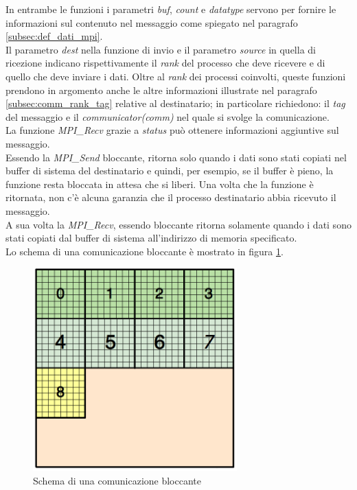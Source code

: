 In entrambe le funzioni i parametri \textit{buf}, \textit{count} e \textit{datatype} servono per fornire le informazioni sul contenuto nel messaggio come spiegato nel paragrafo \ref{subsec:def_dati_mpi}.\\
Il parametro \textit{dest} nella funzione di invio e il parametro \textit{source} in quella di ricezione indicano rispettivamente il \textit{rank} del processo che deve ricevere e di quello che deve inviare i dati. Oltre al \textit{rank} dei processi coinvolti, queste funzioni prendono in argomento anche le altre informazioni illustrate nel paragrafo \ref{subsec:comm_rank_tag} relative al destinatario; in particolare richiedono: il \textit{tag} del messaggio e il \textit{communicator(comm)} nel quale si svolge la comunicazione.\\
La funzione \textit{MPI\_Recv} grazie a \textit{status} può ottenere informazioni aggiuntive sul messaggio.\\
Essendo la \textit{MPI\_Send} bloccante, ritorna solo quando i dati sono stati copiati nel buffer di sistema del destinatario e quindi, per esempio, se il buffer è pieno, la funzione resta bloccata in attesa che si liberi. Una volta che la funzione è ritornata, non c’è alcuna garanzia che il processo destinatario abbia ricevuto il messaggio.\\
A sua volta la \textit{MPI\_Recv}, essendo bloccante ritorna solamente quando i dati sono stati copiati dal buffer di sistema all’indirizzo di memoria specificato.\\
Lo schema di una comunicazione bloccante è mostrato in figura \ref{fig:mpi_block_com}.
\begin{figure}[H]
	\centering
	\includegraphics[width=0.7\textwidth]{immagini/block_on_grid.png}
	\caption{Schema di una comunicazione bloccante}
	\label{fig:mpi_block_com}
\end{figure}
